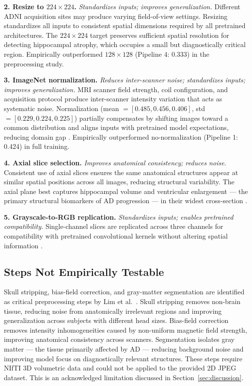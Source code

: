 \documentclass[12pt, a4paper]{article}
\begin{document}
\textbf{2. Resize to $224\times224$.}
\textit{Standardizes inputs; improves generalization.}
Different ADNI acquisition sites may produce varying
field-of-view settings. Resizing standardizes all inputs
to consistent spatial dimensions required by all pretrained
architectures. The $224\times224$ target preserves
sufficient spatial resolution for detecting hippocampal
atrophy, which occupies a small but diagnostically critical
region. Empirically outperformed $128\times128$ (Pipeline
4: 0.333) in the preprocessing study.

\textbf{3. ImageNet normalization.}
\textit{Reduces inter-scanner noise; standardizes inputs;
improves generalization.}
MRI scanner field strength, coil configuration, and
acquisition protocol produce inter-scanner intensity
variation that acts as systematic noise. Normalization
(mean $=[0.485, 0.456, 0.406]$, std $=[0.229, 0.224,
0.225]$) partially compensates by shifting images toward
a common distribution and aligns inputs with pretrained
model expectations, reducing domain gap \cite{lim2022}.
Empirically outperformed no-normalization (Pipeline 1:
0.424) in full training.

\textbf{4. Axial slice selection.}
\textit{Improves anatomical consistency; reduces noise.}
Consistent use of axial slices ensures the same anatomical
structures appear at similar spatial positions across all
images, reducing structural variability. The axial plane
best captures hippocampal volume and ventricular
enlargement --- the primary structural biomarkers of AD
progression --- in their widest cross-section \cite{lim2022}.

\textbf{5. Grayscale-to-RGB replication.}
\textit{Standardizes inputs; enables pretrained compatibility.}
Single-channel slices are replicated across three channels
for compatibility with pretrained convolutional kernels
without altering spatial information \cite{tajbakhsh2016}.

\subsection{Steps Not Empirically Testable}

Skull stripping, bias-field correction, and gray-matter
segmentation are identified as critical preprocessing
steps by Lim et al.\ \cite{lim2022}. Skull stripping
removes non-brain tissue, reducing noise from anatomically
irrelevant regions and improving generalization across
subjects with different head sizes. Bias-field correction
removes intensity inhomogeneities caused by non-uniform
magnetic field strength, improving anatomical consistency
across scanners. Segmentation isolates gray matter ---
the tissue primarily affected by AD --- reducing background
noise and improving model focus on diagnostically relevant
structures. These steps require NIfTI 3D volumetric data
and could not be applied to the provided 2D JPEG dataset.
This is an acknowledged limitation discussed in
Section~\ref{sec:discussion}.
\end{document}
